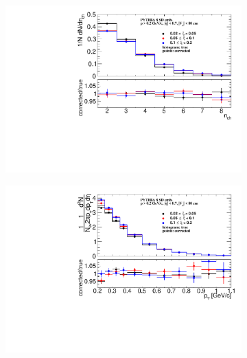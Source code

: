 \begin{figure}[b!]
	\centering
	\begin{subfigure}{.49\textwidth}
		\includegraphics[width=\textwidth,page=1]{chapters/chrgSTAR/img/closure/nch_test.pdf}
	\end{subfigure}
	\hfill
	\begin{subfigure}{.49\textwidth}
		\includegraphics[width=\textwidth,page=1]{chapters/chrgSTAR/img/closure/pt_test.pdf}
	\end{subfigure}
	\begin{subfigure}{.49\textwidth}

\end{subfigure}
\end{figure}
